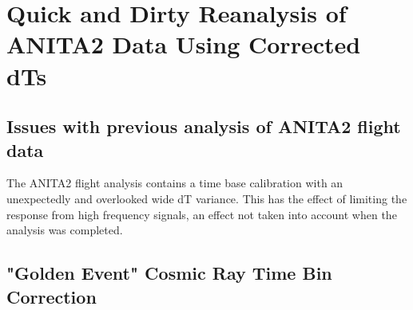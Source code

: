 

















			
\chapter{Quick and Dirty Reanalysis of ANITA2 Data Using Corrected dTs}
\section{Issues with previous analysis of ANITA2 flight data}
	The ANITA2 flight analysis contains a time base calibration with an unexpectedly and overlooked wide dT variance.  This has the effect of limiting the response from high frequency signals, an effect not taken into account when the analysis was completed.

\section{"Golden Event" Cosmic Ray Time Bin Correction}

